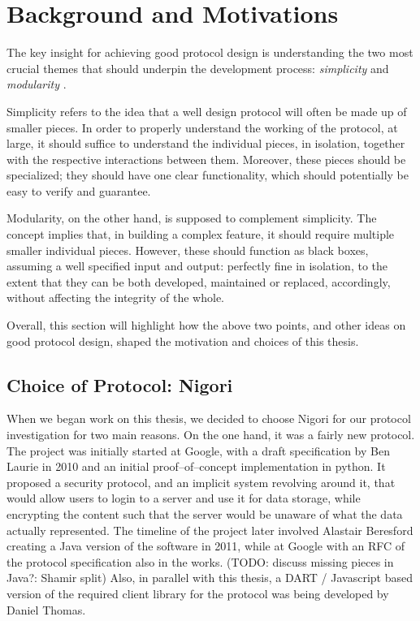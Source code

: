 \chapter{Background and Motivations} \label{chapter:background}
The key insight for achieving good protocol design is understanding the two most crucial themes that should underpin the development process: \textit{simplicity} and \textit{modularity} \cite{ProtocolDesign}.

Simplicity refers to the idea that a well design protocol will often be made up of smaller pieces. In order to properly understand the working of the protocol, at large, it should suffice to understand the individual pieces, in isolation, together with the respective interactions between them. Moreover, these pieces should be specialized; they should have one clear functionality, which should potentially be easy to verify and guarantee.

Modularity, on the other hand, is supposed to complement simplicity. The concept implies that, in building a complex feature, it should require multiple smaller individual pieces. However, these should function as black boxes, assuming a well specified input and output: perfectly fine in isolation, to the extent that they can be both developed, maintained or replaced, accordingly, without affecting the integrity of the whole.

Overall, this section will highlight how the above two points, and other ideas on good protocol design, shaped the motivation and choices of this thesis.

\section{Choice of Protocol: Nigori}
When we began work on this thesis, we decided to choose Nigori for our protocol investigation for two main reasons.
On the one hand, it was a fairly new protocol.
The project was initially started at Google, with a draft specification by Ben Laurie in 2010 \cite{NigoriDraft} and an initial proof--of--concept implementation in python.
It proposed a security protocol, and an implicit system revolving around it, that would allow users to login to a server and use it for data storage, while encrypting the content such that the server would be unaware of what the data actually represented.
The timeline of the project later involved Alastair Beresford creating a Java version of the software in 2011, while at Google with an RFC \cite{NigoriRFC} of the protocol specification also in the works. (TODO: discuss missing pieces in Java?: Shamir split)
Also, in parallel with this thesis, a DART \cite{DART} / Javascript based version of the required client library for the protocol was being developed by Daniel Thomas.

